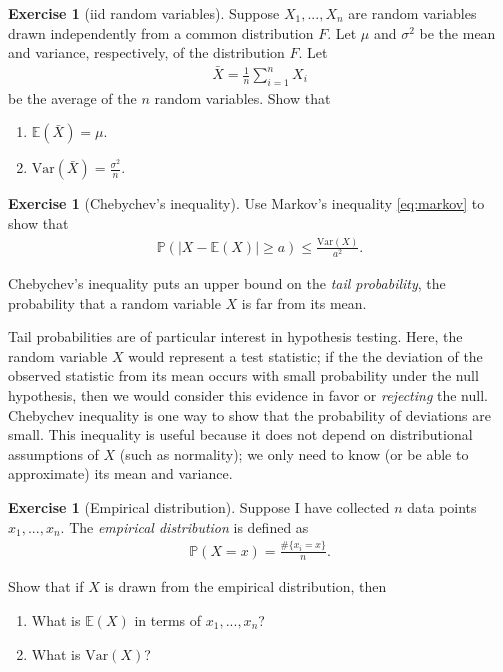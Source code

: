 \documentclass[11pt]{article}
\theoremstyle{definition}
\newtheorem{exercise}[]{Exercise}
\renewcommand{\P}{\mathbb{P}}
\newcommand{\E}{\mathbb{E}}
\newcommand{\V}{\text{Var}}
\begin{document}
\begin{exercise}[iid random variables]
  Suppose $X_1,..., X_n$ are random variables drawn independently from a
  common distribution $F$. Let $\mu$ and $\sigma^2$ be the mean and variance,
  respectively, of the distribution $F$. Let
  \begin{align*}
    \bar{X} = \frac{1}{n} \sum_{i=1}^n X_i
  \end{align*}
  be the average of the $n$ random variables. Show that

  \begin{enumerate}[label = (\alph*)]
    \item $\E(\bar{X}) = \mu$.
    \item $\V(\bar{X}) = \frac{\sigma^2}{n}$.
  \end{enumerate}
\end{exercise}

\begin{exercise}[Chebychev's inequality]
  Use Markov's inequality \eqref{eq:markov} to show that
  \begin{align*}
    \P(|X - \E(X)| \geq a) \leq \frac{\V(X)}{a^2}.
  \end{align*}
\end{exercise}

Chebychev's inequality puts an upper bound on the \textit{tail probability},
the probability that a random variable $X$ is far from its mean.

Tail probabilities are of particular interest in hypothesis testing.
Here, the random variable $X$ would represent a test statistic;
if the the deviation of the observed statistic from its mean occurs with small probability under
the null hypothesis,
then we would consider this evidence in favor or \textit{rejecting} the null.
Chebychev inequality is one way to show that the probability of deviations are small.
This inequality is useful because it does not depend on distributional assumptions of $X$
(such as normality); we only need to know (or be able to approximate) its mean and variance.

\begin{exercise}[Empirical distribution]
Suppose I have collected $n$ data points $x_1, ..., x_n$.
The \textit{empirical distribution}
is defined as
\begin{align}
  \P(X = x) = \frac{\#\{x_i = x\}}{n}.
  \label{eq:empirical}
\end{align}

Show that if $X$ is drawn from the empirical distribution, then
\begin{enumerate}[label = (\alph*)]
  \item What is $\E(X)$ in terms of $x_1, ..., x_n$?
  \item What is $\V(X)$?
\end{enumerate}
\label{exer:empirical}
\end{exercise}
\end{document}
